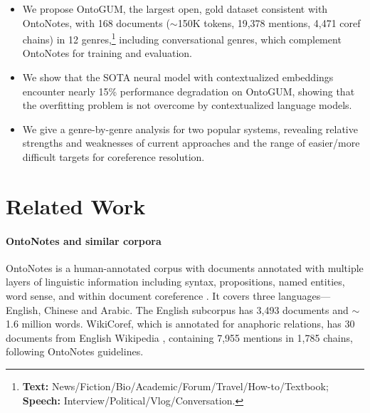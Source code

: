 \documentclass[11pt,a4paper]{article}
\begin{document}
\begin{itemize}
    \item We propose OntoGUM, the largest open, gold dataset consistent with OntoNotes, with 168 documents ($\sim$150K tokens, 19,378 mentions, 4,471 coref chains) in 12 genres,\footnote{\textbf{Text:} News/Fiction/Bio/Academic/Forum/Travel/How-to/Textbook; \textbf{Speech:} Interview/Political/Vlog/Conversation.} including conversational genres, which complement OntoNotes for training and evaluation.
    
    \item We show that the SOTA neural model with contextualized embeddings encounter nearly 15\% performance degradation on OntoGUM, showing that the overfitting problem is not overcome by contextualized language models.
    
    \item We give a genre-by-genre analysis for two popular systems, revealing relative strengths and weaknesses of current approaches and the range of easier/more difficult targets for coreference resolution.
    


\end{itemize}

\section{Related Work}











\paragraph{OntoNotes and similar corpora}
OntoNotes is a human-annotated corpus with documents annotated with multiple layers of linguistic information including syntax, propositions, named entities, word sense, and within document coreference \citep{weischedel-handbook-2011-ontonotes,pradhan-etal-2013-towards}.  It covers three languages---English, Chinese and Arabic. The English subcorpus has 3,493 documents and $\sim$1.6 million words. WikiCoref, which is annotated for anaphoric relations, has 30 documents from English Wikipedia \cite{ghaddar-langlais-2016-wikicoref}, containing 7,955 mentions in 1,785 chains, following OntoNotes guidelines.
\end{document}
